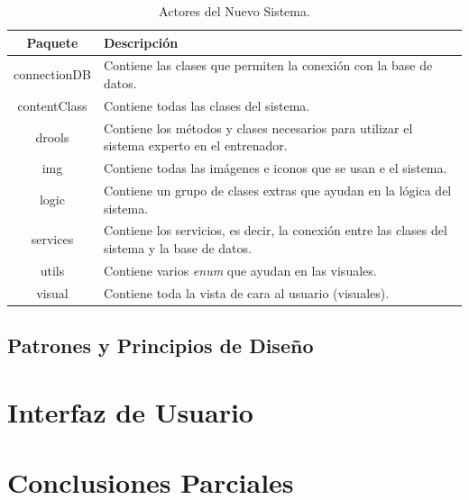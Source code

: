 \begin{table}[h]
\begin{center}
\begin{tabular}{ | c | p{11cm} | }
\hline
\textbf{Paquete} & \textbf{Descripción} \\
\hline
connectionDB & Contiene las clases que permiten la conexión con la base de datos. \\
\hline
contentClass & Contiene todas las clases del sistema. \\
\hline
drools & Contiene los métodos y clases necesarios para utilizar el sistema experto en el entrenador. \\
\hline
img & Contiene todas las imágenes e iconos que se usan e el sistema. \\
\hline
logic & Contiene un grupo de clases extras que ayudan en la lógica del sistema. \\
\hline
services & Contiene los servicios, es decir, la conexión entre las clases del sistema y la base de datos. \\
\hline
utils & Contiene varios \textsl{enum} que ayudan en las visuales. \\
\hline
visual & Contiene toda la vista de cara al usuario (visuales). \\
\hline
\end{tabular}
\caption{Actores del Nuevo Sistema.}
\label{tab:actores}
\end{center}
\end{table}

\subsection{Patrones y Principios de Diseño}


\section{Interfaz de Usuario}


\section{Conclusiones Parciales}